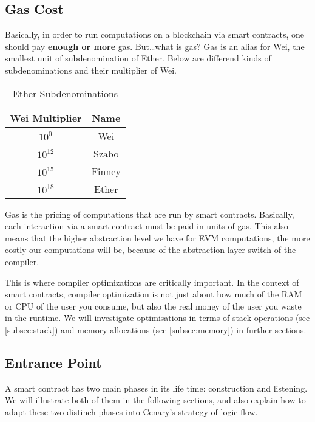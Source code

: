 \documentclass{article}
\begin{document}
\subsection{Gas Cost}
\par Basically, in order to run computations on a blockchain via smart contracts, one should pay \textbf{enough or more} gas. But\ldots what is gas? Gas is an alias for Wei, the smallest unit of subdenomination of Ether. Below are differend kinds of subdenominations and their multiplier of Wei.

\begin{table}[h]
  \centering
  \begin{tabular}{|c|c|}
    \hline
    \textbf{Wei Multiplier} & \textbf{Name} \\
    \hline
    $ 10^0 $ & Wei \\
    \hline
    $ 10^12 $ & Szabo \\
    \hline
    $ 10^15 $ & Finney \\
    \hline
    $ 10^18 $ & Ether \\
    \hline
  \end{tabular}
  \caption{Ether Subdenominations}
  \label{tab:ether_subdenominations}
\end{table}
\par Gas is the pricing of computations that are run by smart contracts. Basically, each interaction via a smart contract must be paid in units of gas. This also means that the higher abstraction level we have for EVM computations, the more costly our computations will be, because of the abstraction layer switch of the compiler.
\par This is where compiler optimizations are critically important. In the context of smart contracts, compiler optimization is not just about how much of the RAM or CPU of the user you consume, but also the real money of the user you waste in the runtime. We will investigate optimisations in terms of stack operations (see \ref{subsec:stack}) and memory allocations (see \ref{subsec:memory}) in further sections.

\subsection{Entrance Point}
\par A smart contract has two main phases in its life time: construction and listening. We will illustrate both of them in the following sections, and also explain how to adapt these two distinch phases into Cenary's strategy of logic flow.
\end{document}
